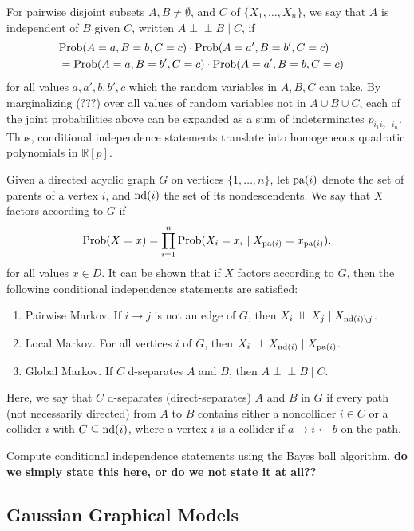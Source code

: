\documentclass{article}
\theoremstyle{definition}
\newcommand{\R}{\mathbb{R}}
\newcommand{\Prob}{{\rm Prob}}
\newcommand{\pa}{{\rm pa}}
\newcommand{\nd}{{\rm nd}}
\def\ci{\perp\!\!\!\perp}
\begin{document}
For pairwise disjoint subsets $A,B\neq\emptyset$, and $C$ of $\{X_1, \ldots, X_n\}$, 
we say that  $A$ is independent of $B$ given $C$, written $A \ci B \mid C$,  if 
\begin{eqnarray} 
\label{condIndep}
&\Prob(A =a,B=b,C=c) \cdot \Prob(A=a',B=b',C=c)& \\&= \Prob(A
=a,B=b',C=c) \cdot \Prob(A=a',B=b,C=c)& \notag
\end{eqnarray}
for all values $a,a',b,b',c$ which the random variables in $A,B,C$ can take. 
By marginalizing (???) over all values of random variables not in $A \cup B \cup C$, each of the
joint probabilities above can be expanded as a sum of indeterminates
$p_{i_1i_2\cdots i_n}$. Thus, conditional independence statements
translate into homogeneous quadratic polynomials in $\R[p]$. 

Given a directed acyclic graph $G$ on vertices $\{1, \ldots, n\}$, let $\pa(i)$ denote the set of parents of a vertex $i$, and
$\nd(i)$ the set of its nondescendents. We say that $X$ factors according to $G$ if
\[
	\Prob(X=x) = \prod_{i=1}^n \Prob(X_i=x_i \mid X_{\pa(i)} = x_{\pa(i)}).
\]
for all values $x \in D$. It can be shown that if $X$ factors according to $G$, then the following conditional independence
statements are satisfied:
\begin{enumerate}
	\item Pairwise Markov. If $i \rightarrow j$ is not an edge  of $G$, then $X_i \ci X_j \mid X_{\nd(i)\setminus j}  $.
	\item Local Markov. For all vertices $i$ of $G$, then $X_i \ci X_{\nd(i)} \mid X_{\pa(i)}$.
	\item Global Markov. If $C$ d-separates $A$ and $B$, then $A \ci B  \mid C$.
\end{enumerate}
Here, we say that $C$ d-separates (direct-separates) $A$ and $B$ in $G$ if
every path (not necessarily directed) from $A$ to $B$ contains either a
noncollider $i \in C$ or a collider $i$ with $C \subseteq \nd(i)$,
where a vertex $i$ is a collider if $a\rightarrow i
\leftarrow b$ on the path.

Compute conditional independence statements using the Bayes ball
algorithm. {\bf do we simply state this here, or do we not state it at all??}


\subsection{Gaussian Graphical Models}
\label{sec:gaussianBackground}
\end{document}
